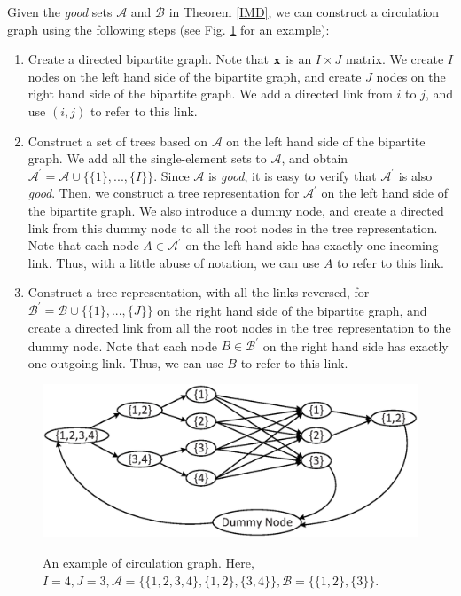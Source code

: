 \documentclass[letterpaper,twocolumn,10pt]{article}
\begin{document}
Given the \emph{good} sets $\mathcal{A}$ and $\mathcal{B}$ in Theorem \ref{IMD}, we can construct a circulation graph using the following steps (see Fig. \ref{flow} for an example):
\begin{enumerate}
  \item Create a directed bipartite graph. Note that ${\bf x}$ is an $I\times J$ matrix. We create $I$ nodes on the left hand side of the bipartite graph, and create $J$ nodes on the right hand side of the bipartite graph. We add a directed link from $i$ to $j$, and use $(i, j)$ to refer to this link.
  \item Construct a set of trees based on $\mathcal{A}$ on the left hand side of the bipartite graph. We add all the single-element sets to $\mathcal{A}$, and obtain $\mathcal{A}^{\prime}=\mathcal{A}\cup\{\{1\}, ...,\{I\}\}$. Since $\mathcal{A}$ is \emph{good}, it is easy to verify that $\mathcal{A}^{\prime}$ is also \emph{good}. Then, we construct a tree representation for $\mathcal{A}^{\prime}$ on the left hand side of the bipartite graph. We also introduce a dummy node, and create a directed link from this dummy node to all the root nodes in the tree representation. Note that each node $A\in\mathcal{A}^{\prime}$ on the left hand side has exactly one incoming link. Thus, with a little abuse of notation, we can use $A$ to refer to this link.
  \item Construct a tree representation, with all the links reversed, for $\mathcal{B}^{\prime}=\mathcal{B}\cup\{\{1\}, ...,\{J\}\}$ on the right hand side of the bipartite graph, and create a directed link from all the root nodes in the tree representation to the dummy node. Note that each node $B\in\mathcal{B}^{\prime}$ on the right hand side has exactly one outgoing link. Thus, we can use $B$ to refer to this link.
\end{enumerate}

\begin{figure}
  \centering
  \includegraphics[scale=0.45]{flow}\\
  \caption{An example of circulation graph. Here, $I=4, J=3, \mathcal{A}=\{\{1,2,3,4\},\{1,2\},\{3,4\}\}, \mathcal{B}=\{\{1,2\},\{3\}\}$.}\label{flow}
\end{figure}
\end{document}
